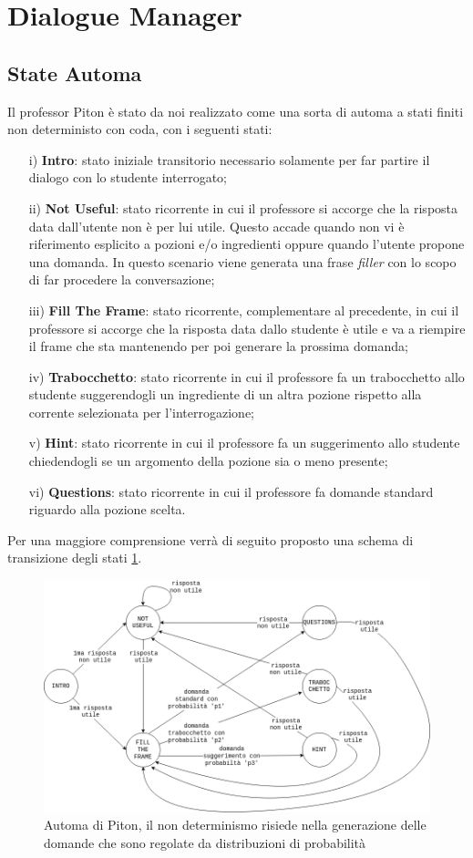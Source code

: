\section{Dialogue Manager}
\subsection{State Automa}
Il professor Piton è stato da noi realizzato come una sorta di automa a stati finiti non deterministo con coda, con i seguenti stati:
\begin{itemize}
    \item[i)]\textbf{Intro}: stato iniziale transitorio necessario solamente per far partire il dialogo con lo studente interrogato;
    \item[ii)]\textbf{Not Useful}: stato ricorrente in cui il professore si accorge che la risposta data dall'utente non è per lui utile. Questo accade quando non vi è riferimento esplicito a pozioni e/o ingredienti oppure quando l'utente propone una domanda. In questo scenario viene generata una frase \textit{filler} con lo scopo di far procedere la conversazione;
    \item[iii)]\textbf{Fill The Frame}: stato ricorrente, complementare al precedente, in cui il professore si accorge che la risposta data dallo studente è utile e va a riempire il frame che sta mantenendo per poi generare la prossima domanda;
    \item[iv)]\textbf{Trabocchetto}: stato ricorrente in cui il professore fa un trabocchetto allo studente suggerendogli un ingrediente di un altra pozione rispetto alla corrente selezionata per l'interrogazione;
    \item[v)]\textbf{Hint}: stato ricorrente in cui il professore fa un suggerimento allo studente chiedendogli se un argomento della pozione sia o meno presente;
    \item[vi)]\textbf{Questions}: stato ricorrente in cui il professore fa domande standard riguardo alla pozione scelta.
\end{itemize}
Per una maggiore comprensione verrà di seguito proposto una schema di transizione degli stati \ref{fig:Automa}.
\begin{figure}[h]
\centerline{\includegraphics[scale=0.4]{Images/stateTransition.png}}
\caption{Automa di Piton, il non determinismo risiede nella generazione delle domande che sono regolate da distribuzioni di probabilità}
\label{fig:Automa}
\end{figure}

